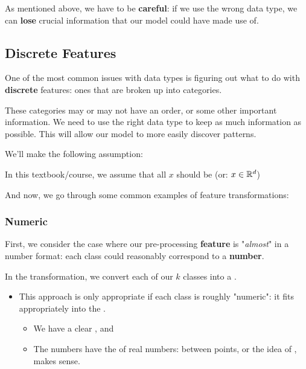         As mentioned above, we have to be \textbf{careful}: if we use the wrong data type, we can \textbf{lose} crucial information that our model could have made use of.

        \subsecdiv

        \subsection{Discrete Features}

            One of the most common issues with data types is figuring out what to do with \textbf{discrete} features: ones that are broken up into categories.

            These categories may or may not have an order, or some other important information. We need to use the right data type to keep as much information as possible. This will allow our model to more easily discover patterns.

            We'll make the following assumption:\\

            \begin{clarification}
                In this textbook/course, we assume that all  $x$ should be  (or: $x \in \mathbb{R}^d$)
            \end{clarification}


            And now, we go through some common examples of feature transformations:

            \subsubsection{Numeric}

                First, we consider the case where our pre-processing \textbf{feature} is "\textit{almost}" in a number format: each class could reasonably correspond to a \textbf{number}.\\
    
                \begin{definition}
                    In the  transformation, we convert each of our $k$ classes into a . 
    
                    \begin{itemize}
                        \item This approach is only appropriate if each class is roughly "numeric": it fits appropriately into the .
                            \begin{itemize}
                                \item We have a clear , and
                                \item The numbers have the  of real numbers:  between points, or the idea of , makes sense.
                            \end{itemize}
                    \end{itemize}
                \end{definition}

